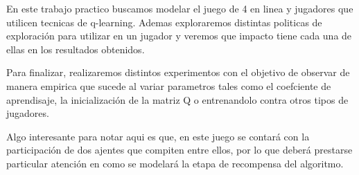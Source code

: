 En este trabajo practico buscamos modelar el juego de 4 en linea y jugadores que utilicen tecnicas de q-learning. Ademas exploraremos distintas politicas de exploración para utilizar en un jugador y veremos que impacto tiene cada una de ellas en los resultados obtenidos. 

Para finalizar, realizaremos distintos experimentos con el objetivo de observar de manera empirica que sucede al variar parametros tales como el coefciente de aprendisaje, la inicialización de la matriz Q o entrenandolo contra otros tipos de jugadores.

Algo interesante para notar aqui es que, en este juego se contará con la participación de dos ajentes que compiten entre ellos, por lo que deberá prestarse particular atención en como se modelará la etapa de recompensa del algoritmo.